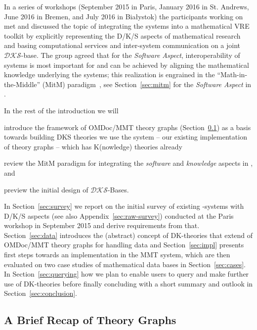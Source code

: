 In a series of workshops (September 2015 in Paris, January 2016 in St. Andrews, June 2016
in Bremen, and July 2016 in Bia{\l}ystok) the participants working on  met
and discussed the topic of integrating the \pn systems into a mathematical VRE toolkit by
explicitly representing the D/K/S aspects of mathematical research and basing
computational services and inter-system communication on a joint $\mathcal{DKS}$-base. The
group agreed that for the \emph{Software Aspect}, interoperability of systems is most
important for \pn and can be achieved by aligning the mathematical knowledge underlying
the systems; this realization is engrained in the ``Math-in-the-Middle'' (MitM)
paradigm~\cite{DehKohKon:iop16}, see Section~\ref{sec:mitm} for the \emph{Software Aspect}
in \pn.

In the rest of the introduction we will
\begin{compactenum}
\item introduce the framework of OMDoc/MMT theory graphs (Section~\ref{sec:MMT}) as a
  basis towards building DKS theories we use the \MMT system -- our existing
  implementation of theory graphs -- which has K(nowledge) theories already
\item review the MitM paradigm for integrating the \emph{software} and \emph{knowledge}
  aspects in \pn, and
\item preview the initial design of $\mathcal{DKS}$-Bases.
\end{compactenum}
In Section~\ref{sec:survey} we report on the initial survey of existing \pn-systems with
D/K/S aspects (see also Appendix~\ref{sec:raw-survey}) conducted at the Paris workshop in
September 2015 and derive requirements from that.  Section~\ref{sec:data} introduces the
(abstract) concept of DK-theories that extend of OMDoc/MMT theory graphs for handling data
and Section~\ref{sec:impl} presents first steps towards an implementation in the MMT
system, which are then evaluated on two case studies of mathematical data bases in
Section~\ref{sec:cases}. In Section~\ref{sec:querying} how we plan to enable users to
query and make further use of DK-theories before finally concluding with a short summary
and outlook in Section~\ref{sec:conclusion}.

\subsection{A Brief Recap of Theory Graphs}\label{sec:MMT}

